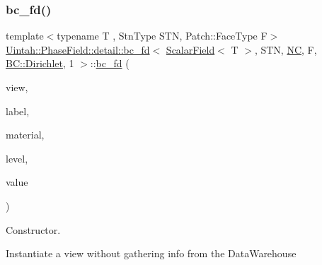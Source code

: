 \subsubsection{\texorpdfstring{bc\+\_\+fd()}{bc\_fd()}\hspace{0.1cm}{\footnotesize\ttfamily [2/3]}}
{\footnotesize\ttfamily template$<$typename T , Stn\+Type S\+TN, Patch\+::\+Face\+Type F$>$ \\
\hyperlink{classUintah_1_1PhaseField_1_1detail_1_1bc__fd}{Uintah\+::\+Phase\+Field\+::detail\+::bc\+\_\+fd}$<$ \hyperlink{structUintah_1_1PhaseField_1_1ScalarField}{Scalar\+Field}$<$ T $>$, S\+TN, \hyperlink{namespaceUintah_1_1PhaseField_a33d355affda78a83f45755ba8388cedda77924170fe82bfd58b74ca3e44139718}{NC}, F, \hyperlink{namespaceUintah_1_1PhaseField_a148fba372aa3be96fd6eede7a2fa10b5abac152b762896edff34ed668ae1a546f}{B\+C\+::\+Dirichlet}, 1 $>$\+::\hyperlink{classUintah_1_1PhaseField_1_1detail_1_1bc__fd}{bc\+\_\+fd} (\begin{DoxyParamCaption}\item[{const \hyperlink{classUintah_1_1PhaseField_1_1detail_1_1view}{view}$<$ \hyperlink{structUintah_1_1PhaseField_1_1ScalarField}{Field} $>$ $\ast$}]{view,  }\item[{const Var\+Label $\ast$}]{label,  }\item[{int}]{material,  }\item[{const Level $\ast$}]{level,  }\item[{const V \&}]{value }\end{DoxyParamCaption})\hspace{0.3cm}{\ttfamily [inline]}}



Constructor. 

Instantiate a view without gathering info from the Data\+Warehouse


